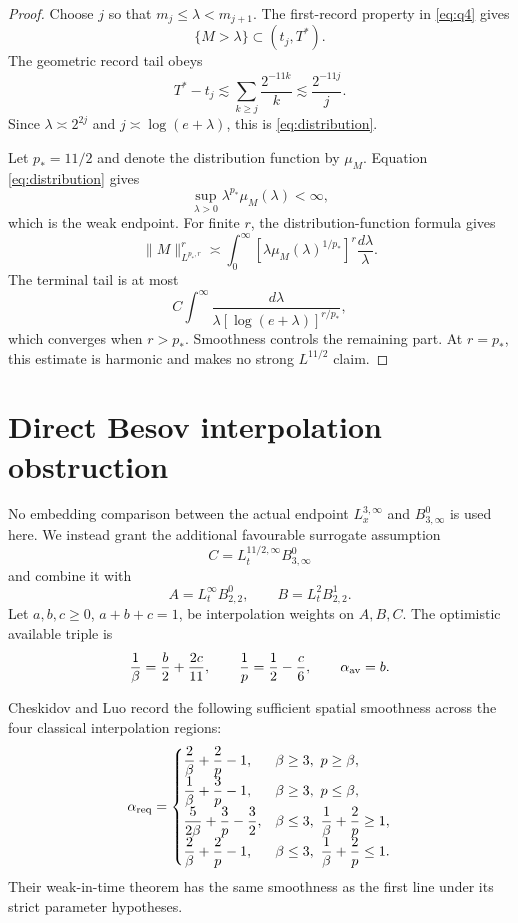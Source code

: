 \documentclass[11pt]{article}
\theoremstyle{remark}
\begin{document}
\begin{proof}
Choose \(j\) so that \(m_j\leq\lambda<m_{j+1}\).  The first-record
property in \eqref{eq:q4} gives
\[
 \{M>\lambda\}\subset(t_j,T^*).
\]
The geometric record tail obeys
\[
 T^*-t_j
 \lesssim
 \sum_{k\geq j}\frac{2^{-11k}}k
 \lesssim\frac{2^{-11j}}j.
\]
Since \(\lambda\asymp2^{2j}\) and
\(j\asymp\log(e+\lambda)\), this is
\eqref{eq:distribution}.

Let \(p_*=11/2\) and denote the distribution function by
\(\mu_M\).  Equation \eqref{eq:distribution} gives
\[
 \sup_{\lambda>0}\lambda^{p_*}\mu_M(\lambda)<\infty,
\]
which is the weak endpoint.  For finite \(r\), the
distribution-function formula gives
\[
 \|M\|_{L^{p_*,r}}^r
 \asymp
 \int_0^\infty
 \left[\lambda\mu_M(\lambda)^{1/p_*}\right]^r
 \frac{d\lambda}{\lambda}.
\]
The terminal tail is at most
\[
 C\int^\infty
 \frac{d\lambda}
 {\lambda[\log(e+\lambda)]^{r/p_*}},
\]
which converges when \(r>p_*\).  Smoothness controls the remaining
part.  At \(r=p_*\), this estimate is harmonic and makes no strong
\(L^{11/2}\) claim.
\end{proof}

\section{Direct Besov interpolation obstruction}

No embedding comparison between the actual endpoint
\(L_x^{3,\infty}\) and \(B^0_{3,\infty}\) is used here.  We instead grant
the additional favourable surrogate assumption
\[
 C=L_t^{11/2,\infty}B^0_{3,\infty}
\]
and combine it with
\[
 A=L_t^\infty B^0_{2,2},
 \qquad
 B=L_t^2B^1_{2,2}.
\]
Let \(a,b,c\geq0\), \(a+b+c=1\), be interpolation weights on
\(A,B,C\).  The optimistic available triple is
\begin{equation}
 \label{eq:hull-triple}
 \frac1\beta=\frac b2+\frac{2c}{11},
 \qquad
 \frac1p=\frac12-\frac c6,
 \qquad
 \alpha_{\rm av}=b.
\end{equation}

Cheskidov and Luo record the following sufficient spatial smoothness
across the four classical interpolation regions:
\begin{equation}
 \label{eq:CL-four}
 \alpha_{\rm req}=
 \begin{cases}
 \dfrac2\beta+\dfrac2p-1,
  &\beta\geq3,\ p\geq\beta,\\[1mm]
 \dfrac1\beta+\dfrac3p-1,
  &\beta\geq3,\ p\leq\beta,\\[1mm]
 \dfrac5{2\beta}+\dfrac3p-\dfrac32,
  &\beta\leq3,\ \dfrac1\beta+\dfrac2p\geq1,\\[1mm]
 \dfrac2\beta+\dfrac2p-1,
  &\beta\leq3,\ \dfrac1\beta+\dfrac2p\leq1.
 \end{cases}
\end{equation}
Their weak-in-time theorem has the same smoothness as the first line
under its strict parameter hypotheses.
\end{document}
